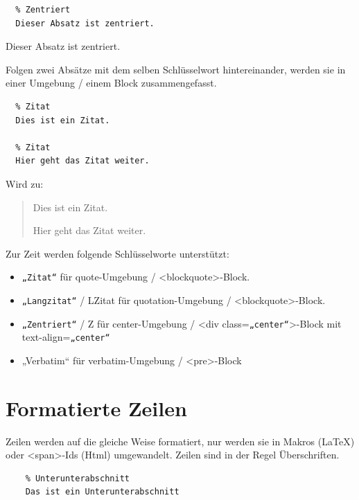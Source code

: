 \documentclass{scrartcl}
\begin{document}
\begin{verbatim}
  % Zentriert
  Dieser Absatz ist zentriert.
\end{verbatim}


\begin{center}
Dieser Absatz ist zentriert.
\end{center}


{Folgen zwei Absätze mit dem selben Schlüsselwort
hintereinander, werden sie in einer Umgebung / einem Block
zusammengefasst.\\}

\begin{verbatim}
  % Zitat
  Dies ist ein Zitat.

  % Zitat
  Hier geht das Zitat weiter.
\end{verbatim}


{Wird zu:\\}

\colorbox{gray!75}{\parbox{\linewidth}{%
\begin{quote}
\centering%
Dies ist ein Zitat.

Hier geht das Zitat weiter.
\end{quote}

}
}

{Zur Zeit werden folgende Schlüsselworte unterstützt:\\}

\begin{itemize}
\item \texttt{„Zitat“} für quote-Umgebung / <blockquote>-Block.
\item \texttt{„Langzitat“} / LZitat für quotation-Umgebung / <blockquote>-Block.
\item \texttt{„Zentriert“} / Z für center-Umgebung / <div class=\texttt{„center“}>-Block mit text-align=\texttt{„center“}
\item „Verbatim“ für verbatim-Umgebung / <pre>-Block
\end{itemize}


\section{Formatierte Zeilen}

{Zeilen werden auf die gleiche Weise formatiert, nur werden sie in Makros (LaTeX) oder <span>-Ids (Html) umgewandelt. Zeilen sind in der Regel Überschriften.\\}

\begin{verbatim}
    % Unterunterabschnitt
    Das ist ein Unterunterabschnitt
\end{verbatim}
\end{document}
